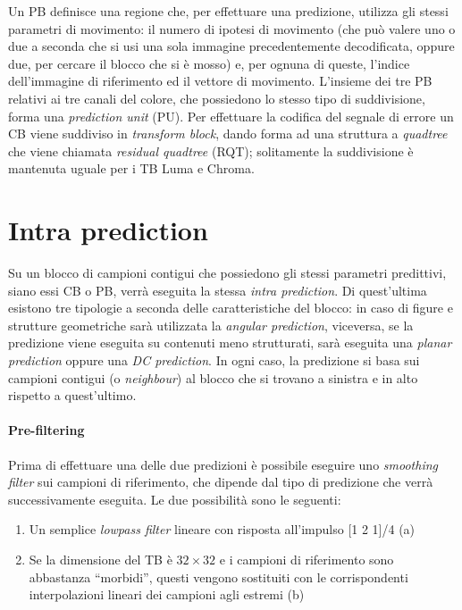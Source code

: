 Un PB definisce una regione che, per effettuare una predizione, utilizza gli 
stessi parametri di movimento: il numero di ipotesi di movimento (che può 
valere uno o due a seconda che si usi una sola immagine precedentemente 
decodificata, oppure due, per cercare il blocco che si è mosso)
 e, per ognuna di queste, 
l'indice dell'immagine di riferimento ed il vettore di movimento.
L'insieme dei tre PB relativi ai tre canali del colore, che possiedono lo 
stesso tipo di suddivisione, forma una \emph{prediction unit} (PU).
Per effettuare la codifica del segnale di errore un CB viene suddiviso in 
\emph{transform block}, dando forma ad una struttura a \emph{quadtree} che 
viene chiamata \emph{residual quadtree} (RQT); solitamente la suddivisione 
è mantenuta uguale per i TB Luma e Chroma.

\newpage 
\section{Intra prediction}\label{ref-intra}
Su un blocco di campioni contigui che possiedono gli stessi parametri 
predittivi, siano essi CB o PB, verrà eseguita la stessa 
\emph{intra prediction}.
Di quest'ultima esistono tre tipologie a seconda delle caratteristiche 
del blocco: in caso di figure e strutture geometriche sarà utilizzata 
la \emph{angular prediction}, viceversa, se la predizione viene eseguita 
su contenuti meno strutturati, sarà eseguita una \emph{planar prediction} 
oppure una \emph{DC prediction}.
In ogni caso, la predizione si basa sui campioni contigui (o 
\emph{neighbour}) al blocco che si trovano a sinistra e in alto rispetto a 
quest'ultimo.

\paragraph*{Pre-filtering}
Prima di effettuare una delle due predizioni è possibile eseguire uno 
\emph{smoothing filter} sui campioni di riferimento, che dipende dal tipo di 
predizione che verrà successivamente eseguita. Le due possibilità sono le 
seguenti:
\begin{enumerate}
\item Un semplice \emph{lowpass filter} lineare con risposta all'impulso 
[1 2 1]/4 (a)
\item Se la dimensione del TB è $32{\times}32$ e i campioni di riferimento sono 
abbastanza ``morbidi'', questi vengono sostituiti con le corrispondenti 
interpolazioni lineari dei campioni agli estremi (b)
\end{enumerate}

